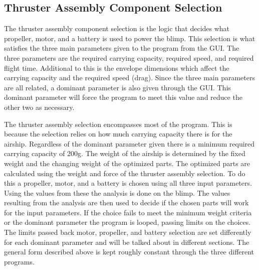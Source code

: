 \documentclass[../main.tex]{subfiles}
\begin{document}
\subsection{Thruster Assembly Component Selection} \label{batterySelect}

The thruster assembly component selection is the logic that decides what propeller, motor, and a battery is used to power the blimp. This selection is what satisfies the three main parameters given to the program from the GUI. The three parameters are the required carrying capacity, required speed, and required flight time. Additional to this is the envelope dimensions which affect the carrying capacity and the required speed (drag). Since the three main parameters are all related, a dominant parameter is also given through the GUI. This dominant parameter will force the program to meet this value and reduce the other two as necessary.

The thruster assembly selection encompasses most of the program. This is because the selection relies on how much carrying capacity there is for the airship. Regardless of the dominant parameter given there is a minimum required carrying capacity of 200g. The weight of the airship is determined by the fixed weight and the changing weight of the optimized parts. The optimized parts are calculated using the weight and force of the thruster assembly selection. To do this a propeller, motor, and a battery is chosen using all three input parameters. Using the values from these the analysis is done on the blimp. The values resulting from the analysis are then used to decide if the chosen parts will work for the input parameters. If the choice fails to meet the minimum weight criteria or the dominant parameter the program is looped, passing limits on the choices. The limits passed back motor, propeller, and battery selection are set differently for each dominant parameter and will be talked about in different sections. The general form described above is kept roughly constant through the three different programs.
\end{document}
